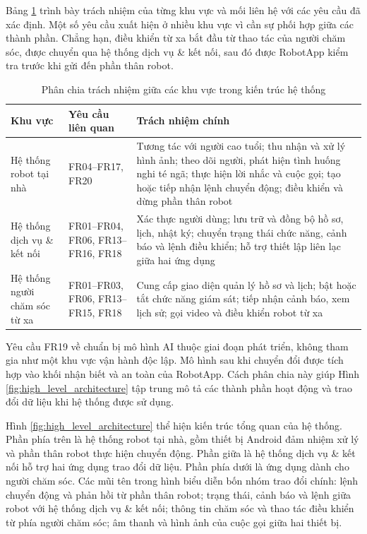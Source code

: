 Bảng \ref{tab:requirements_to_architecture} trình bày trách nhiệm của từng khu vực và mối liên hệ với các yêu cầu đã xác định. Một số yêu cầu xuất hiện ở nhiều khu vực vì cần sự phối hợp giữa các thành phần. Chẳng hạn, điều khiển từ xa bắt đầu từ thao tác của người chăm sóc, được chuyển qua hệ thống dịch vụ \& kết nối, sau đó được RobotApp kiểm tra trước khi gửi đến phần thân robot.

\begin{table}[htbp]
\centering
\caption{Phân chia trách nhiệm giữa các khu vực trong kiến trúc hệ thống}
\label{tab:requirements_to_architecture}
\small
\renewcommand{\arraystretch}{1.12}
\begin{tabularx}{\textwidth}{|p{3.0cm}|p{3.0cm}|X|}
\hline
\textbf{Khu vực} & \textbf{Yêu cầu liên quan} & \textbf{Trách nhiệm chính} \\
\hline
Hệ thống robot tại nhà & FR04--FR17, FR20 & Tương tác với người cao tuổi; thu nhận và xử lý hình ảnh; theo dõi người, phát hiện tình huống nghi té ngã; thực hiện lời nhắc và cuộc gọi; tạo hoặc tiếp nhận lệnh chuyển động; điều khiển và dừng phần thân robot \\
\hline
Hệ thống dịch vụ \& kết nối & FR01--FR04, FR06, FR13--FR16, FR18 & Xác thực người dùng; lưu trữ và đồng bộ hồ sơ, lịch, nhật ký; chuyển trạng thái chức năng, cảnh báo và lệnh điều khiển; hỗ trợ thiết lập liên lạc giữa hai ứng dụng \\
\hline
Hệ thống người chăm sóc từ xa & FR01--FR03, FR06, FR13--FR15, FR18 & Cung cấp giao diện quản lý hồ sơ và lịch; bật hoặc tắt chức năng giám sát; tiếp nhận cảnh báo, xem lịch sử; gọi video và điều khiển robot từ xa \\
\hline
\end{tabularx}
\end{table}

Yêu cầu FR19 về chuẩn bị mô hình AI thuộc giai đoạn phát triển, không tham gia như một khu vực vận hành độc lập. Mô hình sau khi chuyển đổi được tích hợp vào khối nhận biết và an toàn của RobotApp. Cách phân chia này giúp Hình \ref{fig:high_level_architecture} tập trung mô tả các thành phần hoạt động và trao đổi dữ liệu khi hệ thống được sử dụng.

Hình \ref{fig:high_level_architecture} thể hiện kiến trúc tổng quan của hệ thống. Phần phía trên là hệ thống robot tại nhà, gồm thiết bị Android đảm nhiệm xử lý và phần thân robot thực hiện chuyển động. Phần giữa là hệ thống dịch vụ \& kết nối hỗ trợ hai ứng dụng trao đổi dữ liệu. Phần phía dưới là ứng dụng dành cho người chăm sóc. Các mũi tên trong hình biểu diễn bốn nhóm trao đổi chính: lệnh chuyển động và phản hồi từ phần thân robot; trạng thái, cảnh báo và lệnh giữa robot với hệ thống dịch vụ \& kết nối; thông tin chăm sóc và thao tác điều khiển từ phía người chăm sóc; âm thanh và hình ảnh của cuộc gọi giữa hai thiết bị.

